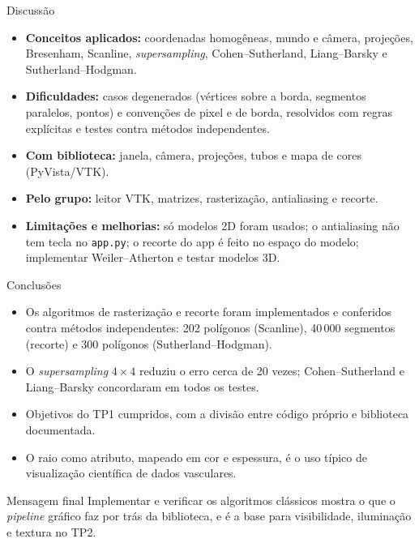 \documentclass[aspectratio=169,11pt]{beamer}
\begin{document}
\begin{frame}{Discussão}
\small
\begin{itemize}
  \item \textbf{Conceitos aplicados:} coordenadas homogêneas, mundo e câmera, projeções, Bresenham, Scanline, \emph{supersampling}, Cohen--Sutherland, Liang--Barsky e Sutherland--Hodgman.
  \item \textbf{Dificuldades:} casos degenerados (vértices sobre a borda, segmentos paralelos, pontos) e convenções de pixel e de borda, resolvidos com regras explícitas e testes contra métodos independentes.
  \item \textbf{Com biblioteca:} janela, câmera, projeções, tubos e mapa de cores (PyVista/VTK).
  \item \textbf{Pelo grupo:} leitor VTK, matrizes, rasterização, antialiasing e recorte.
  \item \textbf{Limitações e melhorias:} só modelos 2D foram usados; o antialiasing não tem tecla no \texttt{app.py}; o recorte do app é feito no espaço do modelo; implementar Weiler--Atherton e testar modelos 3D.
\end{itemize}
\end{frame}

\begin{frame}{Conclusões}
\begin{itemize}
  \item Os algoritmos de rasterização e recorte foram implementados e conferidos contra métodos independentes: 202 polígonos (Scanline), 40\,000 segmentos (recorte) e 300 polígonos (Sutherland--Hodgman).
  \item O \emph{supersampling} $4\times4$ reduziu o erro cerca de 20 vezes; Cohen--Sutherland e Liang--Barsky concordaram em todos os testes.
  \item Objetivos do TP1 cumpridos, com a divisão entre código próprio e biblioteca documentada.
  \item O raio como atributo, mapeado em cor e espessura, é o uso típico de visualização científica de dados vasculares.
\end{itemize}

\vspace{0.25cm}

\begin{block}{Mensagem final}
Implementar e verificar os algoritmos clássicos mostra o que o \emph{pipeline} gráfico faz por trás da biblioteca, e é a base para visibilidade, iluminação e textura no TP2.
\end{block}
\end{frame}
\end{document}
